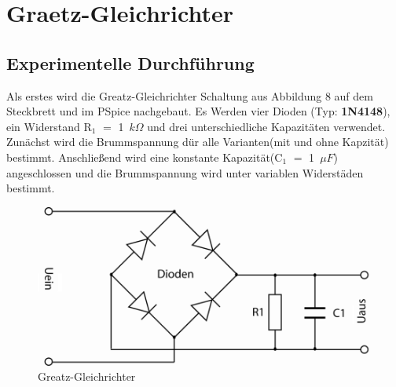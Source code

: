\section{Graetz-Gleichrichter}
\subsection{Experimentelle Durchf\"uhrung}
Als erstes wird die Greatz-Gleichrichter Schaltung aus Abbildung 8 auf dem Steckbrett und im PSpice nachgebaut. Es Werden vier Dioden (Typ: \textbf{1N4148}), ein Widerstand R$_1$ $=$ 1~$k\Omega$ und drei unterschiedliche Kapazit\"aten verwendet. Zun\"achst wird die Brummspannung d\"ur alle Varianten(mit und ohne Kapzit\"at) bestimmt. Anschlie\ss end wird eine konstante Kapazit\"at(C$_1$ $=$ 1~$\mu F$) angeschlossen und die Brummspannung wird unter variablen Widerst\"aden bestimmt. 
\begin{figure}[!h]
\begin{center}
\includegraphics[scale=0.4]{schaltungVersuch3}
\caption{Greatz-Gleichrichter}
\end{center}
\end{figure}
\newpage
